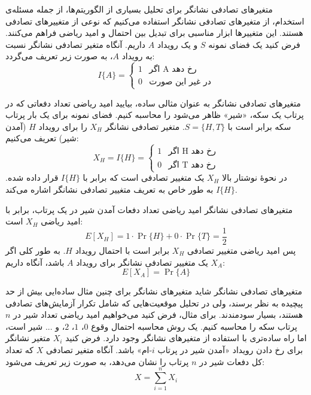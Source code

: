 \begin{itemframe}{متغیرهای تصادفی نشانگر}
\itm
برای تحلیل بسیاری از الگوریتم‌ها، از جمله مسئله‌ی استخدام، از متغیرهای تصادفی نشانگر
استفاده می‌کنیم که نوعی از متغییرهای تصادفی هستند. این متغییرها ابزار مناسبی برای تبدیل بین احتمال و امید ریاضی فراهم می‌کنند.
\itm
فرض کنید یک فضای نمونه $S$ و یک رویداد $A$ داریم.
آنگاه متغیر تصادفی نشانگر نسبت به رویداد $A$، به صورت زیر تعریف می‌گردد:
$$
I\{A\} =
\begin{cases}
1 & \text{اگر A رخ دهد} \\
0 & \text{در غیر این صورت}
\end{cases}
$$

\end{itemframe}


\begin{itemframe}{متغیرهای تصادفی نشانگر}
\itm
به عنوان مثالی ساده، بیایید امید ریاضی تعداد دفعاتی که در پرتاب یک سکه‌، «شیر» ظاهر می‌شود را محاسبه کنیم.
فضای نمونه برای یک بار پرتاب سکه برابر است با
$S = \{H, T\}$.
متغیر تصادفی نشانگر $X_H$ را برای رویداد $H$ (آمدن شیر) تعریف می‌کنیم:
$$
X_H = I\{H\} = \begin{cases}
1 & \text{اگر H رخ دهد} \\
0 & \text{اگر T رخ دهد}
\end{cases}
$$
\itm
در نحوهٔ نوشتار بالا
$X_H$
یک متغییر تصادفی است که برابر با
$I\{H\}$
قرار داده شده.
$I\{H\}$
به طور خاص به تعریف متغییر تصادفی نشانگر اشاره می‌کند.
\end{itemframe}


\begin{itemframe}{متغیرهای تصادفی نشانگر}
\itm
امید ریاضی تعداد دفعات آمدن شیر در یک پرتاب، برابر با امید ریاضی $X_H$ است:
$$
E[X_H] = 1 \cdot \Pr\{H\} + 0 \cdot \Pr\{T\} = \frac{1}{2}
$$
\itm
پس امید ریاضی متغییر تصادفی $X_H$ برابر است با احتمال رویداد $H$.
\itm
به طور کلی اگر $X_A$ یک متغییر تصادفی نشانگر برای رویداد $A$ باشد، آنگاه داریم:
$$
E[X_A] = \Pr\{A\}
$$
\end{itemframe}


\begin{itemframe}{متغیرهای تصادفی نشانگر}
\itm
شاید متغیرهای نشانگر برای چنین مثال ساده‌ایی بیش از حد پیچیده به نظر برسند، ولی در تحلیل موقعیت‌هایی که شامل تکرار آزمایش‌های تصادفی هستند، بسیار سودمندند.
 \itm
برای مثال، فرض کنید می‌خواهیم امید ریاضی تعداد شیر در $n$ پرتاب سکه را محاسبه کنیم. یک روش محاسبه احتمال وقوع $0$، $1$، $2$، و ... شیر است، اما راه ساده‌تری با استفاده از متغیرهای نشانگر وجود دارد.
 \itm
فرض کنید $X_i$ متغیر نشانگر برای رخ دادن رویداد «آمدن شیر در پرتاب $i$-ام» باشد. آنگاه متغیر تصادفی $X$ که تعداد کل دفعات شیر در $n$ پرتاب را نشان می‌دهد، به صورت زیر تعریف می‌شود:
$$
X = \sum_{i=1}^{n} X_i
$$
\end{itemframe}


